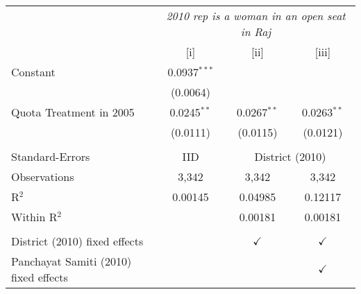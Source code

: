 
\begingroup
\centering
\begin{tabular}{lccc}
   \toprule
    & \multicolumn{3}{c}{\textit{2010 rep is a woman in an open seat in Raj}}\\
                                         & [i]            & [ii]          & [iii]\\  
   \midrule 
   Constant                              & 0.0937$^{***}$ &               &   \\   
                                         & (0.0064)       &               &   \\   
   Quota Treatment in 2005               & 0.0245$^{**}$  & 0.0267$^{**}$ & 0.0263$^{**}$\\   
                                         & (0.0111)       & (0.0115)      & (0.0121)\\   
    \\
   Standard-Errors & IID & \multicolumn{2}{c}{District (2010)} \\ 
   Observations                          & 3,342          & 3,342         & 3,342\\  
   R$^2$                                 & 0.00145        & 0.04985       & 0.12117\\  
   Within R$^2$                          &                & 0.00181       & 0.00181\\  
    \\
   District (2010) fixed effects         &                & $\checkmark$  & $\checkmark$\\   
   Panchayat Samiti (2010) fixed effects &                &               & $\checkmark$\\   
   \bottomrule
\end{tabular}
\par\endgroup


